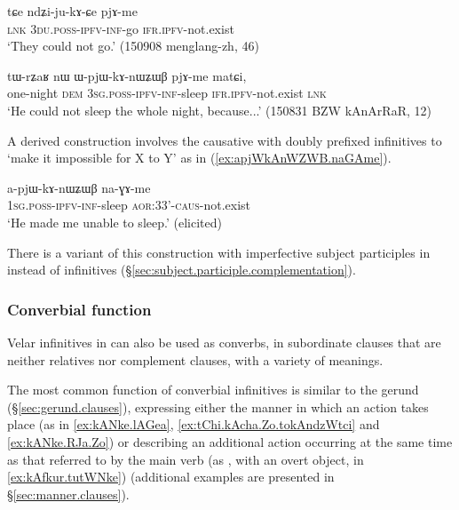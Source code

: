 \begin{exe}
\ex \label{ex:ndZijukACe}
\gll tɕe ndʑi-ju-kɤ-ɕe pjɤ-me \\
\textsc{lnk} \textsc{3du}.\textsc{poss}-\textsc{ipfv}-\textsc{inf}-go \textsc{ifr}.\textsc{ipfv}-not.exist \\
\glt `They could not go.' (150908 menglang-zh, 46)
\end{exe}

\begin{exe}
\ex \label{ex:WpjWkAnWZWB}
\gll tɯ-rʑaʁ nɯ ɯ-pjɯ-kɤ-nɯʑɯβ pjɤ-me matɕi, \\
one-night \textsc{dem} \textsc{3sg}.\textsc{poss}-\textsc{ipfv}-\textsc{inf}-sleep \textsc{ifr}.\textsc{ipfv}-not.exist \textsc{lnk} \\
\glt `He could not sleep the whole night, because...' (150831 BZW kAnArRaR, 12)
\end{exe}

A derived construction involves the causative  with doubly prefixed infinitives to `make it impossible for X to Y' as in (\ref{ex:apjWkAnWZWB.naGAme}).

\begin{exe}
\ex \label{ex:apjWkAnWZWB.naGAme}
\gll a-pjɯ-kɤ-nɯʑɯβ na-ɣɤ-me \\
\textsc{1sg}.\textsc{poss}-\textsc{ipfv}-\textsc{inf}-sleep \textsc{aor}:3\fl{}3'-\textsc{caus}-not.exist \\
\glt `He made me unable to sleep.' (elicited)
\end{exe}

There is a variant of this construction with imperfective subject participles in  instead of infinitives (§\ref{sec:subject.participle.complementation}). 

\subsubsection{Converbial function}    \label{sec:inf.converb}
Velar infinitives in  can also be used as converbs, in subordinate clauses that are neither relatives nor complement clauses, with a variety of meanings.

The most common function of converbial infinitives is similar to the gerund (§\ref{sec:gerund.clauses}), expressing either the manner in which an action takes place (as in \ref{ex:kANke.lAGea}, \ref{ex:tChi.kAcha.Zo.tokAndzWtci} and \ref{ex:kANke.RJa.Zo}) or describing an additional action occurring at the same time as that referred to by the main verb (as , with an overt object, in \ref{ex:kAfkur.tutWNke}) (additional examples are presented in §\ref{sec:manner.clauses}).


